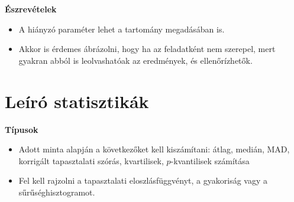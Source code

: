 \documentclass[a4paper]{article}
\begin{document}
\noindent \textbf{Észrevételek}

\begin{itemize}
\item A hiányzó paraméter lehet a tartomány megadásában is.
\item Akkor is érdemes ábrázolni, hogy ha az feladatként nem szerepel, mert gyakran abból is leolvashatóak az eredmények, és ellenőrízhetők.
\end{itemize}

\section{Leíró statisztikák}

\noindent \textbf{Típusok}

\begin{itemize}
\item Adott minta alapján a következőket kell kiszámítani: átlag, medián, MAD, korrigált tapasztalati szórás, kvartilisek, $p$-kvantilisek számítása
\item Fel kell rajzolni a tapasztalati eloszlásfüggvényt, a gyakoriság vagy a sűrűséghisztogramot.
\end{itemize}
\end{document}
